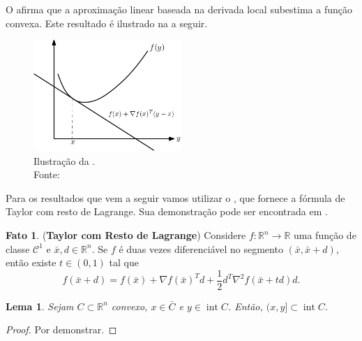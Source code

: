 \documentclass[12pt,a4paper]{scrartcl}
\DeclareMathOperator{\interior}{int}
\def\RR{\mathds{R}}
\def\xbar{\bar{x}}
\newtheorem{lema}{Lema}
\theoremstyle{definition}%
\newtheorem{fato}{Fato}
\begin{document}
O  afirma que a aproximação linear baseada na derivada local subestima a função convexa. Este resultado é ilustrado na  a seguir. 
\begin{figure}[!ht] 
	\centering
	\includegraphics[width=0.50\textwidth]{funcao_convexa_aproximacao_linear_derivada}
	\caption{Ilustração da . \label{fig:funcao_convexa_aproximacao_linear_derivada} \\ Fonte: \textcite{luenberger2008linear}}
\end{figure}

Para os resultados que vem a seguir vamos utilizar o , que fornece a fórmula de Taylor com resto de Lagrange. Sua demonstração pode ser encontrada em \textcite[p.196]{Elon2019}.

\begin{fato}(\textbf{Taylor com Resto de Lagrange}) \label{fato:Taylor_com_resto_lagrange}
Considere $f: \RR^{n} \rightarrow \RR$ uma função de classe $\mathcal{C}^{1}$ e $\xbar, d \in \RR^{n}$. Se $f$ é duas vezes diferenciável no segmento $(\xbar , \xbar + d)$, então existe $t \in (0,1)$ tal que
\[
f(\xbar + d) = f(\xbar) + \nabla f(\xbar)^{T} d + \dfrac{1}{2}d^{T}\nabla^{2} f(\xbar + td)d .
\]
\end{fato}


\begin{lema} \label{lema:auxiliar_para_teo_hessiana_convexidade}
Sejam $C \subset \RR^{n}$ convexo, $x \in \bar{C}$ e $y \in \interior C$. Então, $(x,y] \subset \interior C$.
\end{lema}
\begin{proof}
Por demonstrar.
\end{proof}
\end{document}
